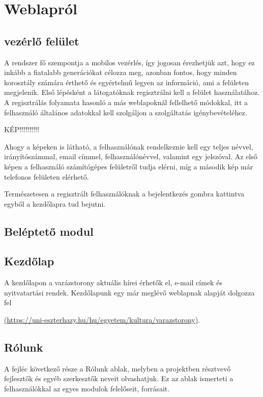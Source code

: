 \documentclass[
]{thesis-ekf}
\theoremstyle{definition}
\theoremstyle{remark}
\begin{document}
	\section{Weblapról}
		\subsection{vezérlő felület}
			A rendszer fő szempontja a mobilos vezérlés, így jogosan érezhetjük azt, hogy ez inkább a fiatalabb generációkat célozza meg, azonban fontos, hogy minden korosztály számára érthető és egyértelmű legyen az információ, ami a felületen megjelenik.
			Első lépésként a látogatóknak regisztrálni kell a felület használatához. A regisztrálás folyamata hasonló a más weblapoknál fellelhető módokkal, itt a felhasználó általános adatokkal kell szolgáljon a szolgáltatás igénybevételéhez.
			
			
			\par KÉP!!!!!!!!!!
			
			\par Ahogy a képeken is látható, a felhasználónak rendelkeznie kell egy teljes névvel, irányítószámmal, email címmel, felhasználónévvel, valamint egy jelszóval. Az első képen a felhasználó számítógépes felületről tudja elérni, míg a második kép már telefonos felületen elérhető.
			\par Természetesen a regisztrált felhasználóknak a bejelentkezés gombra kattintva egyből a kezdőlapra tud bejutni.
			
			
			
		\subsection{Beléptető modul}
		\subsection{Kezdőlap}
			A kezdőlapon a varázstorony aktuális hírei érhetők el, e-mail címek és nyitvatartási rendek. Kezdőlapunk egy már meglévő weblapnak alapját dolgozza fel
			\par \url{(https://uni-eszterhazy.hu/hu/egyetem/kultura/varazstorony)}.
		\subsection{Rólunk}
			\par A fejléc következő része a Rólunk ablak, melyben a projektben résztvevő fejlesztők és egyéb szerkesztők neveit olvashatjuk. Ez az ablak ismerteti a felhasználókkal az egyes modulok felelőseit, forrásait.
\end{document}
